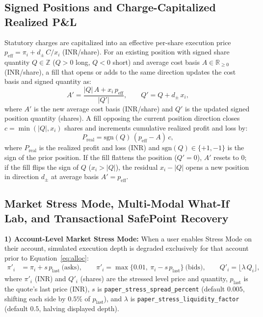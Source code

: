 \documentclass[journal,onecolumn,10pt]{IEEEtran}
\begin{document}
\subsection{Signed Positions and Charge-Capitalized Realized P\&L}
Statutory charges are capitalized into an effective per-share execution price $p_{\mathrm{eff}} = \pi_i + d_{\pm}\,C/x_i$ (INR/share). For an existing position with signed share quantity $Q \in \mathbb{Z}$ ($Q>0$ long, $Q<0$ short) and average cost basis $A \in \mathbb{R}_{\ge 0}$ (INR/share), a fill that opens or adds to the same direction updates the cost basis and signed quantity as:
\begin{equation}
A' = \frac{|Q|\,A + x_i\,p_{\mathrm{eff}}}{|Q'|},\qquad Q' = Q + d_{\pm}\,x_i,
\label{eq:avg}
\end{equation}
where $A'$ is the new average cost basis (INR/share) and $Q'$ is the updated signed position quantity (shares). A fill opposing the current position direction closes $c = \min(|Q|, x_i)$ shares and increments cumulative realized profit and loss by:
\begin{equation}
P_{\mathrm{real}} = \mathrm{sgn}(Q)\,(p_{\mathrm{eff}}-A)\,c,
\label{eq:pnl}
\end{equation}
where $P_{\mathrm{real}}$ is the realized profit and loss (INR) and $\mathrm{sgn}(Q) \in \{+1,-1\}$ is the sign of the prior position. If the fill flattens the position ($Q'=0$), $A'$ resets to $0$; if the fill flips the sign of $Q$ ($x_i > |Q|$), the residual $x_i - |Q|$ opens a new position in direction $d_{\pm}$ at average basis $A' = p_{\mathrm{eff}}$.

\subsection{Market Stress Mode, Multi-Modal What-If Lab, and Transactional SafePoint Recovery}
\textbf{1) Account-Level Market Stress Mode:} When a user enables Stress Mode on their account, simulated execution depth is degraded exclusively for that account prior to Equation~\eqref{eq:alloc}:
\begin{equation}
\begin{aligned}
\pi'_i &= \pi_i + s\,p_{\mathrm{last}} \ \text{(asks)},\qquad
\pi'_i = \max\{0.01,\ \pi_i - s\,p_{\mathrm{last}}\} \ \text{(bids)},\qquad
Q'_i = \lfloor \lambda\,Q_i \rfloor,
\end{aligned}
\label{eq:stress}
\end{equation}
where $\pi'_i$ (INR) and $Q'_i$ (shares) are the stressed level price and quantity, $p_{\mathrm{last}}$ is the quote's last price (INR), $s$ is \texttt{paper\_stress\_spread\_percent} (default $0.005$, shifting each side by $0.5\%$ of $p_{\mathrm{last}}$), and $\lambda$ is \texttt{paper\_stress\_liquidity\_factor} (default $0.5$, halving displayed depth).
\end{document}
